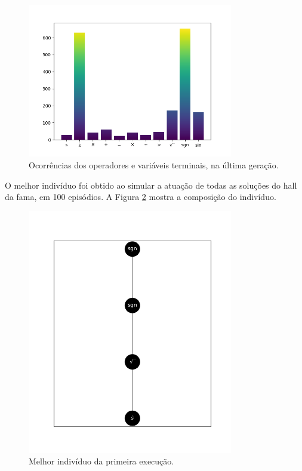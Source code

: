 \begin{figure}[H]
	\centering
	\includegraphics[width=0.8\textwidth]{02_desenvolvimento/04_EC_Fig_MCOperHist.png}
	\caption{Ocorrências dos operadores e variáveis terminais, na última geração.}
	\label{fig:4ec-mcoperhist}
\end{figure}

O melhor indivíduo foi obtido ao simular a atuação de todas as soluções do hall da fama, em 100 episódios. A Figura \ref{fig:4ec-mcindiv1} mostra a composição do indivíduo.

\begin{figure}[H]
	\centering
	\includegraphics[width=0.8\textwidth]{02_desenvolvimento/04_EC_Fig_MCIndiv1.png}
	\caption{Melhor indivíduo da primeira execução.}
	\label{fig:4ec-mcindiv1}
\end{figure}

